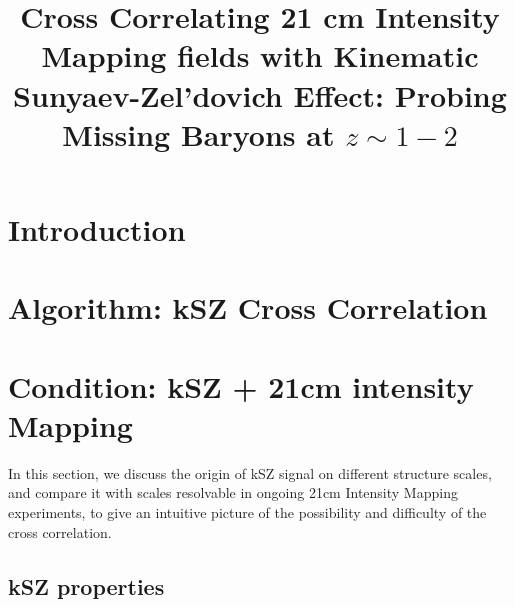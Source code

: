 \documentclass[aps,prd,twocolumn,showpacs,superscriptaddress,groupedaddress,nofootinbib]{revtex4}  %
\begin{document}
\widetext

\title{Cross Correlating 21 cm Intensity Mapping fields with Kinematic Sunyaev-Zel'dovich Effect: Probing Missing Baryons at $z\sim1-2$}


\pacs{}
\maketitle

\section{Introduction}

\section{Algorithm: kSZ Cross Correlation}

\section{Condition: kSZ + 21cm intensity Mapping}
In this section, we discuss the origin of kSZ signal 
on different structure scales, 
and compare it with scales resolvable in 
ongoing 21cm Intensity Mapping experiments, 
to give an intuitive picture of the possibility and
 difficulty of the cross correlation.
\subsection{kSZ properties}

\end{document}
